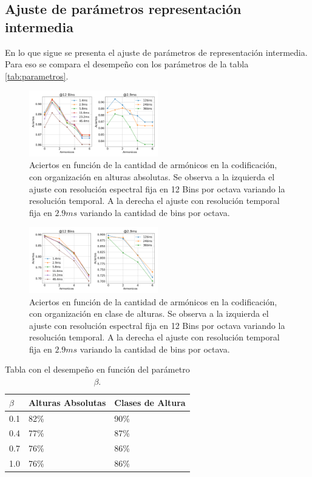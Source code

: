 \documentclass
  [ams,pdfout]%
	{aeslac}
\begin{document}
\subsection{Ajuste de parámetros representación intermedia}
En lo que sigue se presenta el ajuste de parámetros de representación intermedia. Para eso se compara el desempeño con los parámetros de la  tabla \ref{tab:parametros}.

\begin{figure}[h!]
\begin{center}
\includegraphics[width=0.5\textwidth]{imagenes/aciertos_cqt} 
\caption{Aciertos en función de la cantidad de armónicos en la codificación, con organización en alturas absolutas. Se observa a la izquierda el ajuste con resolución espectral fija en 12 Bins por octava variando la resolución temporal. A la derecha el ajuste con resolución temporal fija en $2.9ms$ variando la cantidad de bins por octava. }
\label{fig:aciertos_cqt}
\end{center}
\end{figure} 

\begin{figure}[h!]
\begin{center}
\includegraphics[width=0.5\textwidth]{imagenes/aciertos_chroma} 
\caption{Aciertos en función de la cantidad de armónicos en la codificación, con organización en clase de alturas. Se observa a la izquierda el ajuste con resolución espectral fija en 12 Bins por octava variando la resolución temporal. A la derecha el ajuste con resolución temporal fija en $2.9ms$ variando la cantidad de bins por octava. }
\label{fig:aciertos_chroma}
\end{center}
\end{figure} 

\begin{table}[!ht]
\caption{Tabla con el desempeño en función del parámetro $\beta$.}
\label{tab:beta}
\vspace*{10pt}
\centering
\small
\begin{tabular}{lll}
\textbf{$\beta$}	&	\textbf{Alturas Absolutas} &	\textbf{Clases de Altura}\\ \hline
0.1 & 82\% & 90\% \\
0.4 & 77\% & 87\% \\
0.7 & 76\% & 86\% \\
1.0 & 76\% & 86\% \\
\end{tabular}
\end{table}
\end{document}
